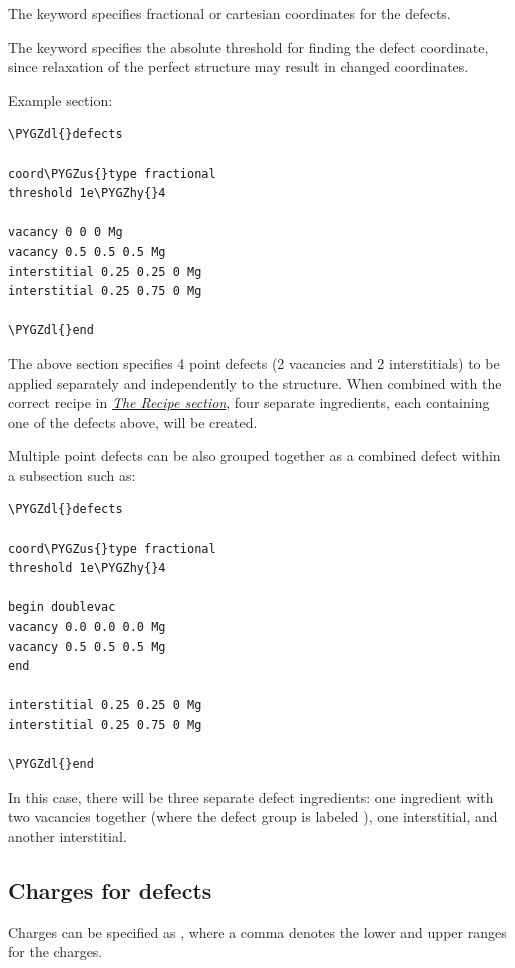 \documentclass[letterpaper,10pt,english]{sphinxmanual}
\def\PYGZus{\char`\_}
\def\PYGZdl{\char`\$}
\def\PYGZhy{\char`\-}
\begin{document}
The  keyword specifies fractional or cartesian coordinates for the defects.

The  keyword specifies the absolute threshold for finding the defect coordinate, since relaxation of the perfect structure may result in changed coordinates.

Example  section:

\begin{Verbatim}[commandchars=\\\{\}]
\PYGZdl{}defects

coord\PYGZus{}type fractional
threshold 1e\PYGZhy{}4

vacancy 0 0 0 Mg
vacancy 0.5 0.5 0.5 Mg
interstitial 0.25 0.25 0 Mg
interstitial 0.25 0.75 0 Mg

\PYGZdl{}end
\end{Verbatim}

The above section specifies 4 point defects (2 vacancies and 2 interstitials) to be applied separately and independently to the structure. When combined with the correct recipe in {\hyperref[3_1_3_recipe::doc]{\emph{The Recipe section}}}, four separate ingredients, each containing one of the defects above, will be created.

Multiple point defects can be also grouped together as a combined defect within a  subsection such as:

\begin{Verbatim}[commandchars=\\\{\}]
\PYGZdl{}defects

coord\PYGZus{}type fractional
threshold 1e\PYGZhy{}4

begin doublevac
vacancy 0.0 0.0 0.0 Mg
vacancy 0.5 0.5 0.5 Mg
end

interstitial 0.25 0.25 0 Mg
interstitial 0.25 0.75 0 Mg

\PYGZdl{}end
\end{Verbatim}

In this case, there will be three separate defect ingredients: one ingredient with two vacancies together (where the defect group is labeled ), one interstitial, and another interstitial.


\subsection{Charges for defects}
\label{3_1_5_defects:charges-for-defects}
Charges can be specified as , where a comma denotes the lower and upper ranges for the charges.
\end{document}
